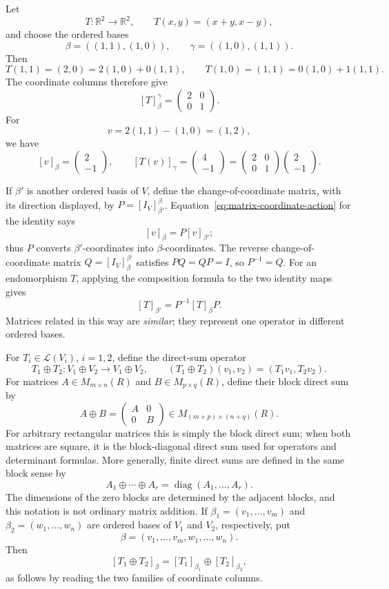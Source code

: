 \begin{example}
Let
\[
T:\mathbb R^2\longrightarrow\mathbb R^2,
\qquad
T(x,y)=(x+y,x-y),
\]
and choose the ordered bases
\[
\beta=((1,1),(1,0)),
\qquad
\gamma=((1,0),(1,1)).
\]
Then
\[
T(1,1)=(2,0)=2(1,0)+0(1,1),
\qquad
T(1,0)=(1,1)=0(1,0)+1(1,1).
\]
The coordinate columns therefore give
\[
[T]^\gamma_\beta=
\begin{pmatrix}2&0\\0&1\end{pmatrix}.
\]
For
\[
v=2(1,1)-(1,0)=(1,2),
\]
we have
\[
[v]_\beta=
\begin{pmatrix}2\\-1\end{pmatrix},
\qquad
[T(v)]_\gamma=
\begin{pmatrix}4\\-1\end{pmatrix}
=
\begin{pmatrix}2&0\\0&1\end{pmatrix}
\begin{pmatrix}2\\-1\end{pmatrix}.
\]
\end{example}

If \(\beta'\) is another ordered basis of \(V\), define the
change-of-coordinate matrix, with its direction displayed, by
\(P=[I_V]^\beta_{\beta'}\). Equation~\eqref{eq:matrix-coordinate-action}
for the identity says
\[
[v]_\beta=P[v]_{\beta'};
\]
thus \(P\) converts \(\beta'\)-coordinates into \(\beta\)-coordinates. The
reverse change-of-coordinate matrix
\(Q=[I_V]^{\beta'}_\beta\) satisfies \(PQ=QP=I\), so \(P^{-1}=Q\).
For an endomorphism \(T\), applying the composition formula to the two
identity maps gives
\[
[T]_{\beta'}=P^{-1}[T]_\beta P.
\]
Matrices related in this way are \emph{similar}; they represent one operator
in different ordered bases.

For \(T_i\in\mathcal L(V_i)\), \(i=1,2\), define the direct-sum operator
\[
T_1\oplus T_2:V_1\oplus V_2\longrightarrow V_1\oplus V_2,
\qquad
(T_1\oplus T_2)(v_1,v_2)=(T_1v_1,T_2v_2).
\]
For matrices \(A\in M_{m\times n}(R)\) and
\(B\in M_{p\times q}(R)\), define their block direct sum by
\[
A\oplus B=\begin{pmatrix}A&0\\0&B\end{pmatrix}
\in M_{(m+p)\times(n+q)}(R).
\]
For arbitrary rectangular matrices this is simply the block direct sum; when
both matrices are square, it is the block-diagonal direct sum used for
operators and determinant formulas. More generally, finite direct sums are
defined in the same block sense by
\[
A_1\oplus\cdots\oplus A_r
=\operatorname{diag}(A_1,\ldots,A_r).
\]
The dimensions of the zero blocks are determined by the adjacent blocks, and
this notation is not ordinary matrix addition. If
\(\beta_1=(v_1,\ldots,v_m)\) and \(\beta_2=(w_1,\ldots,w_n)\) are ordered
bases of \(V_1\) and \(V_2\), respectively, put
\[
\beta=(v_1,\ldots,v_m,w_1,\ldots,w_n).
\]
Then
\[
[T_1\oplus T_2]_\beta
=[T_1]_{\beta_1}\oplus[T_2]_{\beta_2},
\]
as follows by reading the two families of coordinate columns.

